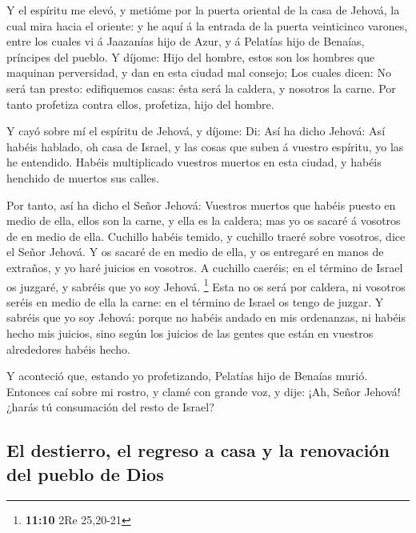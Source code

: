  Y el espíritu me elevó, y metióme por la puerta oriental
de la casa de Jehová, la cual mira hacia el oriente: y he aquí á la
entrada de la puerta veinticinco varones, entre los cuales vi á
Jaazanías hijo de Azur, y á Pelatías hijo de Benaías, príncipes del
pueblo.  Y díjome: Hijo del hombre, estos son los hombres
que maquinan perversidad, y dan en esta ciudad mal consejo;
 Los cuales dicen: No será tan presto: edifiquemos casas:
ésta será la caldera, y nosotros la carne.  Por tanto
profetiza contra ellos, profetiza, hijo del hombre.

 Y cayó sobre mí el espíritu de Jehová, y díjome: Di: Así
ha dicho Jehová: Así habéis hablado, oh casa de Israel, y las cosas que
suben á vuestro espíritu, yo las he entendido.  Habéis
multiplicado vuestros muertos en esta ciudad, y habéis henchido de
muertos sus calles.

 Por tanto, así ha dicho el Señor Jehová: Vuestros muertos
que habéis puesto en medio de ella, ellos son la carne, y ella es la
caldera; mas yo os sacaré á vosotros de en medio de ella. 
Cuchillo habéis temido, y cuchillo traeré sobre vosotros, dice el Señor
Jehová.  Y os sacaré de en medio de ella, y os entregaré
en manos de extraños, y yo haré juicios en vosotros.  A
cuchillo caeréis; en el término de Israel os juzgaré, y sabréis que yo
soy Jehová. \footnote{\textbf{11:10} 2Re 25,20-21}  Esta
no os será por caldera, ni vosotros seréis en medio de ella la carne: en
el término de Israel os tengo de juzgar.  Y sabréis que
yo soy Jehová: porque no habéis andado en mis ordenanzas, ni habéis
hecho mis juicios, sino según los juicios de las gentes que están en
vuestros alrededores habéis hecho.

 Y aconteció que, estando yo profetizando, Pelatías hijo
de Benaías murió. Entonces caí sobre mi rostro, y clamé con grande voz,
y dije: ¡Ah, Señor Jehová! ¿harás tú consumación del resto de Israel?

\hypertarget{el-destierro-el-regreso-a-casa-y-la-renovaciuxf3n-del-pueblo-de-dios}{%
\subsection{El destierro, el regreso a casa y la renovación del pueblo
de
Dios}\label{el-destierro-el-regreso-a-casa-y-la-renovaciuxf3n-del-pueblo-de-dios}}

